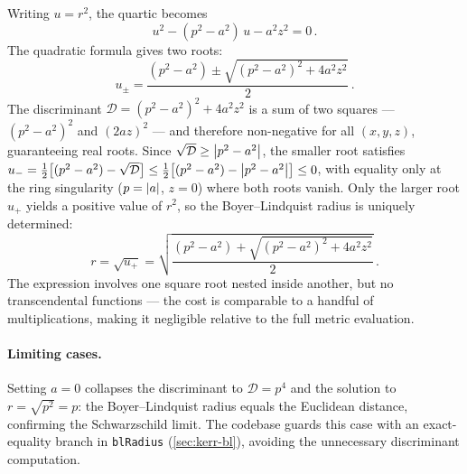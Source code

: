 Writing $u = r^2$, the quartic becomes
%
\begin{equation}
  u^2 - (p^2 - a^2)\,u - a^2 z^2 = 0 \,.
  \label{eq:bl-quadratic-u}
\end{equation}
%
The quadratic formula gives two roots:
%
\begin{equation}
  u_\pm = \frac{(p^2 - a^2) \pm
    \sqrt{(p^2 - a^2)^2 + 4a^2 z^2}}{2} \,.
  \label{eq:bl-u-roots}
\end{equation}
%
The discriminant $\mathcal{D} = (p^2 - a^2)^2 + 4a^2 z^2$ is a sum
of two squares --- $(p^2 - a^2)^2$ and $(2az)^2$ --- and therefore
non-negative for all $(x, y, z)$, guaranteeing real roots.  Since
$\sqrt{\mathcal{D}} \geq \left\lvert p^2 - a^2 \right\rvert$, the smaller root
satisfies
$u_- = \tfrac{1}{2}\bigl[(p^2 - a^2) - \sqrt{\mathcal{D}}\bigr]
\leq \tfrac{1}{2}\bigl[(p^2 - a^2) - \left\lvert p^2 - a^2 \right\rvert\bigr] \leq 0$,
with equality only at the ring singularity ($p = \left\lvert a \right\rvert$, $z = 0$)
where both roots vanish.  Only the larger root $u_+$ yields a
positive value of $r^2$, so the Boyer--Lindquist radius is uniquely
determined:
%
\begin{equation}
  r = \sqrt{u_+}
    = \sqrt{\frac{(p^2 - a^2)
      + \sqrt{(p^2 - a^2)^2 + 4a^2 z^2}}{2}} \,.
  \label{eq:bl-r-solution}
\end{equation}
%
The expression involves one square root nested inside another, but no
transcendental functions --- the cost is comparable to a handful of
multiplications, making it negligible relative to the full metric
evaluation.

\paragraph{Limiting cases.}

Setting $a = 0$ collapses the discriminant to
$\mathcal{D} = p^4$ and the solution to $r = \sqrt{p^2} = p$: the
Boyer--Lindquist radius equals the Euclidean distance, confirming
the Schwarzschild limit.  The codebase guards this case with an
exact-equality branch in \texttt{blRadius}
(\cref{sec:kerr-bl}), avoiding the unnecessary discriminant
computation.

